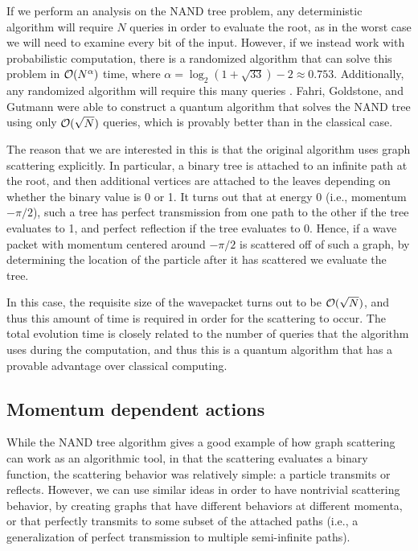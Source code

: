 \documentclass[../thesis-main/thesis-main]{subfiles}
\begin{document}
If we perform an analysis on the NAND tree problem, any deterministic algorithm will require $N$ queries in order to evaluate the root, as in the worst case we will need to examine every bit of the input.  However, if we instead work with probabilistic computation, there is a randomized algorithm \cite{SW86} that can solve this problem in $\mathcal{O}(N^\alpha)$ time, where $\alpha = \log_2(1 + \sqrt{33}) - 2 \approx 0.753$.  Additionally, any randomized algorithm will require this many queries \cite{San95}.  Fahri, Goldstone, and Gutmann were able to construct a quantum algorithm that solves the NAND tree using only $\mathcal{O}(\sqrt{N})$ queries, which is provably better than in the classical case.

The reason that we are interested in this is that the original algorithm uses graph scattering explicitly.  In particular, a binary tree is attached to an infinite path at the root, and then additional vertices are attached to the leaves depending on whether the binary value is 0 or 1.  It turns out that at energy 0 (i.e., momentum $-\pi/2$), such a tree has perfect transmission from one path to the other if the tree evaluates to 1, and perfect reflection if the tree evaluates to 0.  Hence, if a wave packet with momentum centered around $-\pi/2$ is scattered off of such a graph, by determining the location of the particle after it has scattered we evaluate the tree. 

In this case, the requisite size of the wavepacket turns out to be $\mathcal{O}(\sqrt{N})$, and thus this amount of time is required in order for the scattering to occur.  The total evolution time is closely related to the number of queries that the algorithm uses during the computation, and thus this is a quantum algorithm that has a provable advantage over classical computing.

\subsection{Momentum dependent actions}

While the NAND tree algorithm gives a good example of how graph scattering can work as an algorithmic tool, in that the scattering evaluates a binary function, the scattering behavior was relatively simple: a particle transmits or reflects.  However, we can use similar ideas in order to have nontrivial scattering behavior, by creating graphs that have different behaviors at different momenta, or that perfectly transmits to some subset of the attached paths (i.e., a generalization of perfect transmission to multiple semi-infinite paths).
\end{document}
